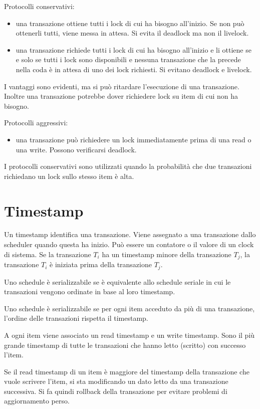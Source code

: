 Protocolli conservativi:
\begin{itemize}
    \item una transazione ottiene tutti i lock di cui ha bisogno all'inizio. Se non pu\`o ottenerli tutti, viene messa in attesa. Si evita il deadlock ma non il livelock.
    \item una transazione richiede tutti i lock di cui ha bisogno all'inizio e li ottiene se e solo se tutti i lock sono disponibili e nessuna transazione che la precede nella coda \`e in attesa di uno dei lock richiesti. Si evitano deadlock e livelock.
\end{itemize}

I vantaggi sono evidenti, ma si pu\`o ritardare l'esecuzione di una transazione. Inoltre una transazione potrebbe dover richiedere lock su item di cui non ha bisogno.

Protocolli aggressivi:
\begin{itemize}
    \item una transazione pu\`o richiedere un lock immediatamente prima di una read o una write. Possono verificarsi deadlock.
\end{itemize}

I protocolli conservativi sono utilizzati quando la probabilit\`a che due transazioni richiedano un lock sullo stesso item \`e alta.

\section{Timestamp}

Un timestamp identifica una transazione. Viene assegnato a una transazione dallo scheduler quando questa ha inizio. Pu\`o essere un contatore o il valore di un clock di sistema. Se la transazione $T_i$ ha un timestamp minore della transazione $T_j$, la transazione $T_i$ \`e iniziata prima della transazione $T_j$.

Uno schedule \`e serializzabile se \`e equivalente allo schedule seriale in cui le transazioni vengono ordinate in base al loro timestamp.

Uno schedule \`e serializzabile se per ogni item acceduto da pi\`u di una transazione, l'ordine delle transazioni rispetta il timestamp.

A ogni item viene associato un read timestamp e un write timestamp. Sono il pi\`u grande timestamp di tutte le transazioni che hanno letto (scritto) con successo l'item.

Se il read timestamp di un item \`e maggiore del timestamp della transazione che vuole scrivere l'item, si sta modificando un dato letto da una transazione successiva. Si fa quindi rollback della transazione per evitare problemi di aggiornamento perso.

